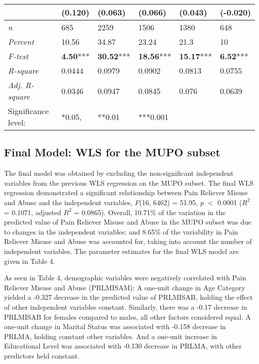 \documentclass[sigconf]{acmart}
\begin{document}
\begin{table*}[ht]
\begin{tabular}{llllll}
           & \textbf{(0.120)}& \textbf{(0.063)}& \textbf{(0.066)}& (0.043)& (-0.020) \\
    \midrule
    \textit{n}       & 685& 2259& 1506&  1380& 648 \\
    \textit{Percent} & 10.56& 34.87& 23.24& 21.3& 10 \\
    \textit{F-test}  & \textbf{4.50}*** & \textbf{30.52}***& \textbf{18.56}***& \textbf{15.17}***& \textbf{6.52}***  \\ 
    \textit{R-square}& 0.0444& 0.0979& 0.0902& 0.0813& 0.0755 \\ 
    \textit{Adj. R-square}& 0.0346 & 0.0947& 0.0845& 0.076& 0.0639 \\
    \bottomrule
    Significance level:&  *0.05,& **0.01& ***0.001&
  \end{tabular}
\end{table*}


\subsection{Final Model: WLS for the MUPO subset}

The final model was obtained by excluding the non-significant independent 
variables from the previous WLS regression on the MUPO subset. The final WLS 
regression demonstrated a significant relationship between Pain Reliever Misuse 
and Abuse and the independent variables, \textit{F}(16, 6462) = 51.95, 
\textit{p} $<$ 0.0001 ($R^2$ = 0.1071, adjusted $R^2$ = 0.0865). Overall, 
10.71\% of the variation in the predicted value of Pain Reliever Misuse and 
Abuse in the MUPO subset was due to changes in the independent variables; 
and 8.65\% of the variability in Pain Reliever Misuse and Abuse was accounted 
for, taking into account the number of independent variables. The parameter 
estimates for the final WLS model are given in Table 4. 

As seen in Table 4, demographic variables were negatively correlated with Pain 
Reliever Misuse and Abuse (PRLMISAM): A one-unit change in Age Category yielded a 
-0.327 decrease in the predicted value of PRLMISAB, holding the effect of other 
independent variables constant. Similarly, there was a -0.17 decrease in PRLMISAB 
for females compared to males, all other factors considered equal. A one-unit 
change in Marital Status was associated with -0.158 decrease in PRLMA, holding
constant other variables. And a one-unit increase in Educational Level was 
associated with -0.130 decrease in PRLMA, with other predictors held constant. 
\end{document}
